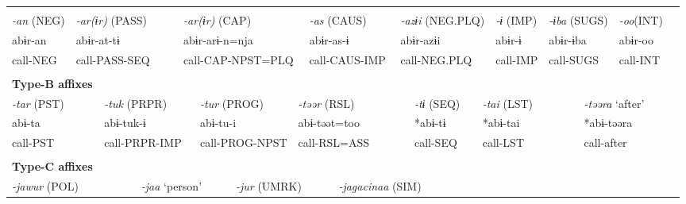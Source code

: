 \tabletail{}
\tablelasttail{}
\begin{tabularx}{\textwidth}{XXXXXXXXXXXXXXXXXXXXXX}
\lsptoprule
\multicolumn{22}{X}{{\bfseries Type-A affixes}}\\
{ \textit{{}-an} (NEG)} & \multicolumn{3}{X}{{ \textit{{}-ar(ɨr)} (PASS)}} & \multicolumn{5}{X}{{ \textit{{}-ar(ɨr)} (CAP)}} & \multicolumn{3}{X}{{ \textit{{}-as} (CAUS)}} & \multicolumn{5}{X}{{ \textit{{}-azɨi} (NEG.PLQ)}} & { \textit{{}-ɨ} (IMP)} & \multicolumn{2}{X}{{ \textit{{}-ɨba} (SUGS)}} & { \textit{{}-oo}(INT)} & \\
{ abɨr-an} & \multicolumn{3}{X}{{ abɨr-at-tɨ}} & \multicolumn{5}{X}{{ abɨr-arɨ-n=nja}} & \multicolumn{3}{X}{{ abɨr-as-ɨ}} & \multicolumn{5}{X}{{ abɨr-azɨi}} & { abɨr-ɨ} & \multicolumn{2}{X}{{ abɨr-ɨba}} & { abɨr-oo} & \\
call-NEG & \multicolumn{3}{X}{call-PASS-SEQ} & \multicolumn{5}{X}{call-CAP-NPST=PLQ} & \multicolumn{3}{X}{call-CAUS-IMP} & \multicolumn{5}{X}{call-NEG.PLQ} & call-IMP & \multicolumn{2}{X}{call-SUGS} & call-INT & \\
\multicolumn{22}{X}{}\\
\multicolumn{22}{X}{{\bfseries Type-B affixes}}\\
\multicolumn{2}{X}{{ \textit{{}-tar} (PST)}} & \multicolumn{3}{X}{{ \textit{{}-tuk} (PRPR)}} & \multicolumn{3}{X}{{ \textit{{}-tur} (PROG)}} & \multicolumn{5}{X}{{ \textit{{}-təər} (RSL)}} & \multicolumn{3}{X}{{ \textit{{}-tɨ} (SEQ)}} & \multicolumn{3}{X}{{ \textit{{}-tai} (LST)}} & \multicolumn{3}{X}{{ \textit{{}-təəra} ‘after’}}\\
\multicolumn{2}{X}{{ abɨ-ta}} & \multicolumn{3}{X}{{ abɨ-tuk-ɨ}} & \multicolumn{3}{X}{{ abɨ-tu-i}} & \multicolumn{5}{X}{{ abɨ-təət=too}} & \multicolumn{3}{X}{{ *abɨ-tɨ}} & \multicolumn{3}{X}{{ *abɨ-tai}} & \multicolumn{3}{X}{{ *abɨ-təəra}}\\
\multicolumn{2}{X}{call-PST} & \multicolumn{3}{X}{call-PRPR-IMP} & \multicolumn{3}{X}{call-PROG-NPST} & \multicolumn{5}{X}{call-RSL=ASS} & \multicolumn{3}{X}{call-SEQ} & \multicolumn{3}{X}{call-LST} & \multicolumn{3}{X}{{ call-after}}\\
\multicolumn{2}{X}{} & \multicolumn{3}{X}{} & \multicolumn{3}{X}{} & \multicolumn{5}{X}{} & \multicolumn{3}{X}{} & \multicolumn{3}{X}{} & \multicolumn{3}{X}{}\\
\multicolumn{22}{X}{{\bfseries Type-C affixes}}\\
\multicolumn{3}{X}{{ \textit{{}-jawur} (POL)}} & \multicolumn{3}{X}{{ \textit{{}-jaa} ‘person’}} & \multicolumn{4}{X}{{ \textit{{}-jur} (UMRK)}} & \multicolumn{4}{X}{{ \textit{{}-jagacinaa} (SIM)}} & \multicolumn{8}{X}{}\\

\end{tabularx}

